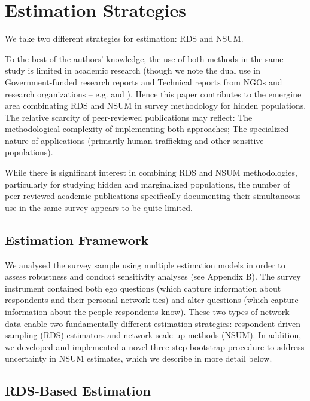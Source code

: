 \documentclass[
  12pt,
  letterpaper,
  DIV=11,
  numbers=noendperiod]{scrartcl}
\theoremstyle{plain}
\theoremstyle{definition}
\begin{document}
\section{Estimation Strategies}\label{estimation-strategies}

We take two different strategies for estimation: RDS and NSUM.

To the best of the authors' knowledge, the use of both methods in the
same study is limited in academic research (though we note the dual use
in Government-funded research reports and Technical reports from NGOs
and research organizations -- e.g. \textcite{ist20-prevalence} and
\textcite{hick25-human}). Hence this paper contributes to the emergine
area combinating RDS and NSUM in survey methodology for hidden
populations. The relative scarcity of peer-reviewed publications may
reflect: The methodological complexity of implementing both approaches;
The specialized nature of applications (primarily human trafficking and
other sensitive populations).

While there is significant interest in combining RDS and NSUM
methodologies, particularly for studying hidden and marginalized
populations, the number of peer-reviewed academic publications
specifically documenting their simultaneous use in the same survey
appears to be quite limited.

\subsection{Estimation Framework}\label{estimation-framework}

We analysed the survey sample using multiple estimation models in order
to assess robustness and conduct sensitivity analyses (see Appendix B).
The survey instrument contained both ego questions (which capture
information about respondents and their personal network ties) and alter
questions (which capture information about the people respondents know).
These two types of network data enable two fundamentally different
estimation strategies: respondent-driven sampling (RDS) estimators and
network scale-up methods (NSUM). In addition, we developed and
implemented a novel three-step bootstrap procedure to address
uncertainty in NSUM estimates, which we describe in more detail below.

\subsection{RDS-Based Estimation}\label{rds-based-estimation}
\end{document}
